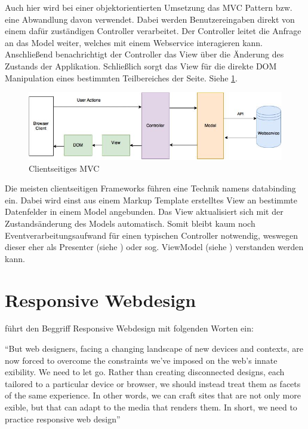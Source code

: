 Auch hier wird bei einer objektorientierten Umsetzung das MVC Pattern bzw. eine Abwandlung davon verwendet. Dabei werden Benutzereingaben direkt von einem dafür zuständigen Controller verarbeitet. Der Controller leitet die Anfrage an das Model weiter, welches mit einem Webservice interagieren kann. Anschließend benachrichtigt der Controller das View über die Änderung des Zustands der Applikation. Schließlich sorgt das View für die direkte DOM Manipulation eines bestimmten Teilbereiches der Seite.
Siehe \ref{fig:client_side_mvc}.

\begin{figure}[htp]     %
\centering
\includegraphics[width=1.0\textwidth]{images/client_side_mvc}
\caption{Clientseitiges MVC}\label{fig:client_side_mvc}
\end{figure}

Die meisten clientseitigen Frameworks führen eine Technik namens \gls{databinding} ein. Dabei wird einst aus einem Markup Template erstelltes View an bestimmte Datenfelder in einem Model angebunden. Das View aktualisiert sich mit der Zustandsänderung des Models automatisch. Somit bleibt kaum noch Eventverarbeitungsaufwand für einen typischen Controller notwendig, weswegen dieser eher als Presenter (siehe \cite{MSDN:2010:MVP}) oder sog. ViewModel (siehe \cite{MSDN:2009:MVVM}) verstanden werden kann.


\section{Responsive Webdesign}

\cite[S.8]{Marcotte:2011} führt den Beggriff Responsive Webdesign mit folgenden Worten ein:

\enquote{But web designers, facing a changing landscape of new devices and contexts, are now forced to overcome the constraints we’ve imposed on the web’s innate  exibility.
We need to let go.
Rather than creating disconnected designs, each tailored to a particular device or browser, we should instead treat them as facets of the same experience. In other words, we can craft sites that are not only more  exible, but that can adapt to the media that renders them.
In short, we need to practice responsive web design}

